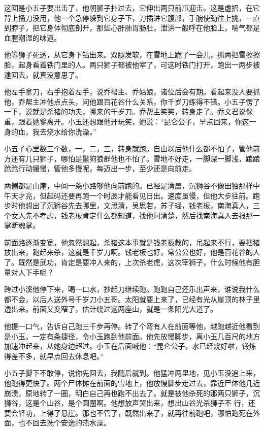 这回是小五子要出击了，他朝狮子扑过去，它伸出两只前爪迎击。这是虚招，在它背上捅刀没用，他一个急停躲到它身子下，刀插进它腹部，手腕使劲往上挑，一直到脖子，把它身体彻底剖开，那些心肝肺胃肠肚，泄洪一般呼在他脸上，喘气都是血腥潮湿的味道。

他等狮子死透，从它身下钻出来。双腿发软，在雪地上跪了一会儿，抓两把雪擦擦脸，起身看着铁门里的人。两只狮子都被他宰了，可这时铁门打开，跑出一两步被逮回去，就真没意思了。

他左手拿刀，右手抱着左手，说乔帮主、乔姑娘，诸位后会有期。看起来没人要抓他，乔帮主冲他点点头，问他跟百花谷什么关系，你千岁刀练得不错。小五子愣了一下，说就是杀猪的功夫，哪来的千岁刀。乔帮主笑笑，转身走了。乔文君说保重，跟着她爹离开。小玉还想跟他开玩笑，她说：“昆仑公子，早点回来，你这一身的血，我去烧水给你洗澡。”

小五子心里数三个数，一，二，三，转身就跑。自由以后他什么都不怕了，管他前方还有几只狮子，哪怕是鬣狗狼群他也不怕了。雪地不好走，一脚深一脚浅，踉踉跄跄行动缓慢，管他多慢呢，每迈出一步，至少还是向前走。

两侧都是山崖，中间一条小路够他向前跑的。已经是清晨，沉狮谷不像田独那样中午天才亮，但起码还要再跑一个时辰才能看见日出。速度虽慢，但他大步往前。跑步时他想出了沉狮谷先去哪里，文思清，吴思若，苏子瑶，钱老板，南海真人，三个女人先不考虑，钱老板肯定什么都知道，找他问清楚，然后找南海真人去报那一掌断魂掌。

前面路逐渐变宽，他忽然想起，杀猪这本事就是钱老板教的，吊起来不行，要把猪放出来，跑起来杀，这就是千岁刀啊。钱老板也好，常公公也好，他是百花谷的人了。既然是武功，肯定是要冲人来的，上次杀老虎，这次宰狮子，什么时候他有胆量对人下手呢？

跨过小溪他停下来，喝一口水，抄起刀继续跑。跑跑自己还乐出声来，谁说我什么都不会，以后人送外号千岁刀小五哥。太阳就要上来了，已经有光从崖顶的林子里透出来。前面又变窄了，估计绕过这两座山，就是一条阳光大道了。

他提一口气，告诉自己跑三千步再停。转了个弯有人在前面等他，越跑越近他看到是小玉。一定有条捷径，令小玉跑到他前面。他先放慢脚步，离小玉几百尺的地方加速冲起来，从她身边超过。小玉在后面喊他：“昆仑公子，水已经烧好啦，锻炼得差不多，就早点回去休息吧。”

小五子脚下不敢停，说你先回去，我随后就到。他猛冲两里地，见小玉没追上来，他跑得更快了。两个尸体摊在前面的雪地上，他放慢脚步走过去，靠近尸体他几近崩溃，原地转了一圈，明白自己再也跑不出去了。就是被他杀死的那两只狮子，沉狮谷，这是个山谷，是个圆圈啊。他想放声哭出来，想出山谷光杀狮子不
行，还要会轻功，上得了悬崖。那也不管了，既然出来了，就再往前跑吧，哪怕跑死在外面，也不回去洗个安逸的热水澡。

